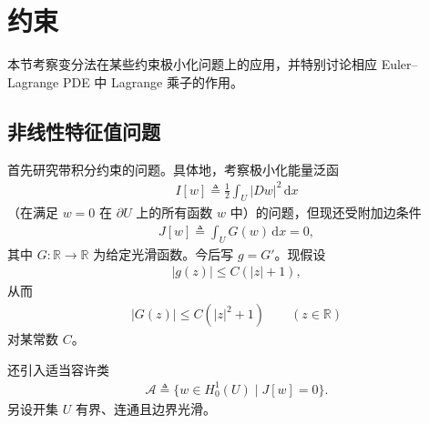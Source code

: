 \documentclass[../../main.tex]{subfiles}
\begin{document}
\section{约束}\label{section:ch08-4-约束}

本节考察变分法在某些约束极小化问题上的应用，并特别讨论相应 Euler--Lagrange PDE 中 Lagrange 乘子的作用。

\subsection{非线性特征值问题}\label{subsection:ch08-4-1-非线性特征值}

首先研究带积分约束的问题。具体地，考察极小化能量泛函
\begin{align}
I[w]\triangleq\frac12\int_U|Dw|^2\,\mathrm{d}x\label{align:ch08-4-eq01}
\end{align}
（在满足 $w=0$ 在 $\partial U$ 上的所有函数 $w$ 中）的问题，但现还受附加边条件
\begin{align}
J[w]\triangleq\int_U G(w)\,\mathrm{d}x=0,\label{align:ch08-4-eq02}
\end{align}
其中 $G:\mathbb{R}\to\mathbb{R}$ 为给定光滑函数。今后写 $g=G'$。现假设
\begin{align}
|g(z)|\leqslant C(|z|+1),\label{align:ch08-4-eq03}
\end{align}
从而
\begin{align}
|G(z)|\leqslant C(|z|^2+1)\qquad (z\in\mathbb{R})\label{align:ch08-4-eq04}
\end{align}
对某常数 $C$。

还引入适当容许类
\begin{align*}
\mathcal{A}\triangleq\{w\in H_0^1(U)\mid J[w]=0\}.
\end{align*}
另设开集 $U$ 有界、连通且边界光滑。
\end{document}
